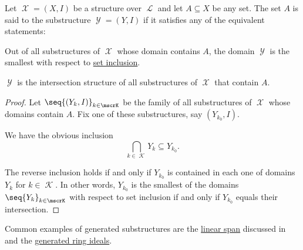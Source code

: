 \begin{definition}\label{def:first_order_generated_substructure}
  Let \( \mscrX = (X, I) \) be a structure over \( \mscrL \) and let \( A \subseteq X \) be any set. The set \( A \) is said to  the substructure \( \mscrY = (Y, I) \) if it satisfies any of the equivalent statements:
  \begin{thmenum}
     Out of all substructures of \( \mscrX \) whose domain contains \( A \), the domain \( \mscrY \) is the smallest with respect to \hyperref[def:subset]{set inclusion}.

     \( \mscrY \) is the intersection structure of all substructures of \( \mscrX \) that contain \( A \).
  \end{thmenum}
\end{definition}
\begin{proof}
  Let \( \seq{ (Y_k, I) }_{k \in \mscrK} \) be the family of all substructures of \( \mscrX \) whose domains contain \( A \). Fix one of these substructures, say \( (Y_{k_0}, I) \).

  We have the obvious inclusion
  \begin{equation*}
    \bigcap_{k \in \mscrK} Y_k \subseteq Y_{k_0}.
  \end{equation*}

  The reverse inclusion holds if and only if \( Y_{k_0} \) is contained in each one of domains \( Y_k \) for \( k \in \mscrK \). In other words, \( Y_{k_0} \) is the smallest of the domains \( \seq{ Y_k }_{k \in \mscrK} \) with respect to set inclusion if and only if \( Y_{k_0} \) equals their intersection.
\end{proof}

\begin{example}\label{ex:def:first_order_generated_substructure}
  Common examples of generated substructures are the \hyperref[def:semimodule/submodel]{linear span} discussed in  and the \hyperref[def:semiring_ideal/generated]{generated ring ideals}.
\end{example}

